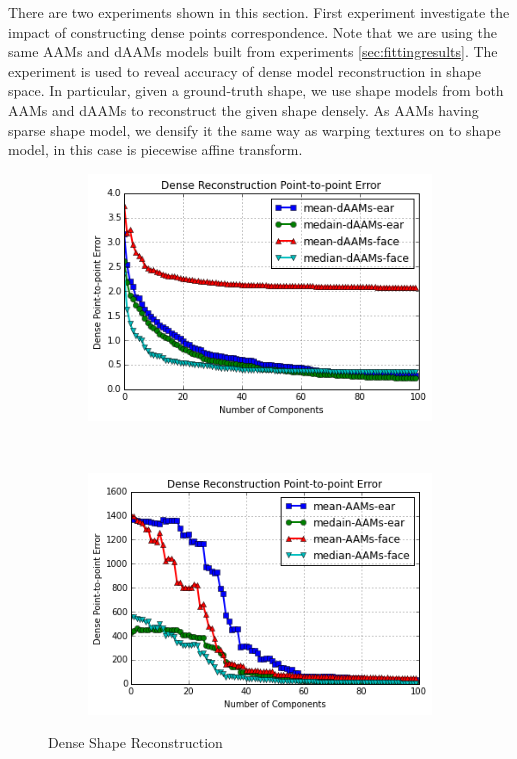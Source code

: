 There are two experiments shown in this section. First experiment investigate the impact of constructing dense points correspondence. Note that we are using the same AAMs and dAAMs models built from experiments \ref{sec:fittingresults}. The experiment is used to reveal accuracy of dense model reconstruction in shape space. In particular, given a ground-truth shape, we use shape models from both AAMs and dAAMs to reconstruct the given shape densely. As AAMs having sparse shape model, we densify it the same way as warping textures on to shape model, in this case is piecewise affine transform. 

\begin{figure}[!b]
    \centering
    \vspace*{-0.1in}
    \begin{subfigure}[b]{0.4\textwidth}
            \includegraphics[width=\textwidth]{supports/Model_Analysis/sr_daams}
    \end{subfigure}
    \\
    \begin{subfigure}[b]{0.4\textwidth}
            \includegraphics[width=\textwidth]{supports/Model_Analysis/sr_aams}
    \end{subfigure}
    \caption{Dense Shape Reconstruction}
    \label{fig:rc_face}
\end{figure}


